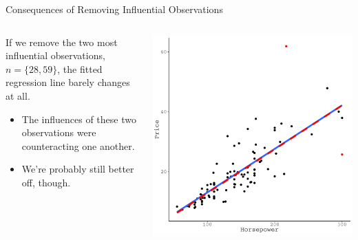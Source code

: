 \documentclass{beamer}\usepackage[]{graphicx}\usepackage[]{color}
\makeatletter
\def\maxwidth{ %
  \ifdim\Gin@nat@width>\linewidth
    \linewidth
  \else
    \Gin@nat@width
  \fi
}
\newenvironment{knitrout}{}{} %
\makeatother
\begin{document}

\begin{frame}{Consequences of Removing Influential Observations}
    
  \begin{columns}
    \begin{column}{0.5\textwidth}
      
      If we remove the two most influential observations, $n = \{28, 59\}$, the 
      fitted regression line barely changes at all.  
      \vc
      \begin{itemize}
      \item The influences of these two observations were counteracting one 
        another.
      \item We're probably still better off, though.
      \end{itemize}
      
    \end{column}
    
    \begin{column}{0.5\textwidth}
      
\begin{knitrout}\footnotesize
{}\color{fgcolor}

{\centering \includegraphics[width=\maxwidth]{figure/unnamed-chunk-39-1} 

}



\end{knitrout}

\end{column}
\end{columns}

\end{frame}
\end{document}
